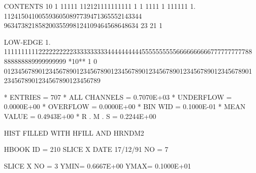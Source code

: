 \begin{Listing}
 CONTENTS  10                    1 11111 112121111111111                 1  1   1111 1   111111                     
            1.             1124150410055936050897739471365552143344 963473821858200355998124109464568648634 23 21  1
 
 LOW-EDGE   1.            111111111122222222223333333333444444444455555555556666666666777777777788888888889999999999
 *10**  1   0   0123456789012345678901234567890123456789012345678901234567890123456789012345678901234567890123456789
 
 * ENTRIES =        707      * ALL CHANNELS = 0.7070E+03      * UNDERFLOW = 0.0000E+00      * OVERFLOW = 0.0000E+00
 * BIN WID = 0.1000E-01      * MEAN VALUE   = 0.4943E+00      * R . M . S = 0.2244E+00
 
 HIST FILLED WITH HFILL AND HRNDM2                                               
 
 HBOOK     ID =       210             SLICE X                    DATE  17/12/91              NO =   7
 
 SLICE X     NO =   3     YMIN=  0.6667E+00  YMAX=  0.1000E+01
 

\end{Listing}

